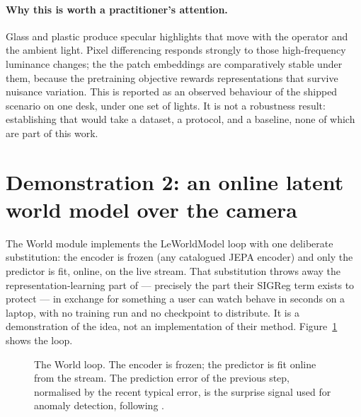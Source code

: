 \documentclass[11pt,onecolumn]{article}
\begin{document}
\paragraph{Why this is worth a practitioner{\rq}s attention.}
Glass and plastic produce specular highlights that move with the operator and the ambient
light. Pixel differencing responds strongly to those high-frequency luminance changes; the
the patch embeddings are comparatively stable under them, because the pretraining
objective rewards representations that survive nuisance variation. This is reported as an
observed behaviour of the shipped scenario on one desk, under one set of lights. It is
not a robustness result: establishing that would take a dataset, a protocol, and a
baseline, none of which are part of this work.

\section{Demonstration 2: an online latent world model over the camera}
\label{sec:world}

The World module implements the LeWorldModel loop \cite{lewm2026} with one deliberate
substitution: the encoder is frozen (any catalogued JEPA encoder) and only the predictor
is fit, online, on the live stream. That substitution throws away the representation-learning part of \cite{lewm2026} ---
precisely the part their SIGReg term exists to protect --- in exchange for something a
user can watch behave in seconds on a laptop, with no training run and no checkpoint to
distribute. It is a demonstration of the idea, not an implementation of their method. Figure~\ref{fig:loop} shows the loop.

\begin{figure}[t]
\centering
{}
\caption{The World loop. The encoder is frozen; the predictor is fit online from the
stream. The prediction error of the previous step, normalised by the recent typical error,
is the surprise signal used for anomaly detection, following \cite{lewm2026}.}
\label{fig:loop}
\end{figure}
\end{document}
